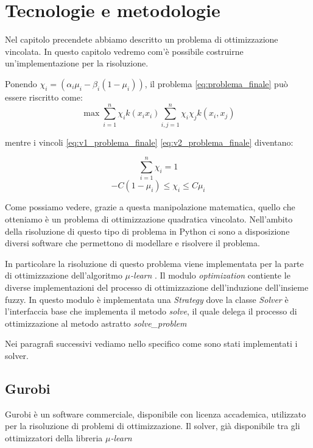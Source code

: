 \documentclass[a4paper,12pt]{report}
\begin{document}
\chapter{Tecnologie e metodologie}
\label{Capitolo 2}
Nel capitolo precendete abbiamo descritto un problema di ottimizzazione vincolata. In questo capitolo vedremo com'è possibile costruirne un'implementazione per la risoluzione.

\bigskip

\noindent Ponendo $\chi_i = (\alpha_i\mu_i - \beta_i(1-\mu_i))$, il problema \ref{eq:problema_finale} può essere riscritto come:
\begin{equation}
    \max \displaystyle\sum_{i=1}^{n}\chi_ik(x_ix_i)\displaystyle\sum_{i,j=1}^{n}\chi_i\chi_j k(x_i,x_j)
\label{eq:problema_finale_2}
\end{equation}

\noindent mentre i vincoli \ref{eq:v1_problema_finale} \ref{eq:v2_problema_finale} diventano:

\begin{equation}
    \displaystyle\sum_{i=1}^{n}\chi_i = 1
    \label{eq:v1_problema_finale_2}
\end{equation}
\begin{equation}
    -C(1-\mu_i) \le \chi_i \le C\mu_i
    \label{eq:v2_problema_finale_2}
\end{equation}

\noindent Come possiamo vedere, grazie a questa manipolazione matematica, quello che otteniamo è un problema di ottimizzazione quadratica vincolato.
Nell'ambito della risoluzione di questo tipo di problema in Python ci sono a disposizione diversi software che permettono di modellare e risolvere il problema.

In particolare la risoluzione di questo problema viene implementata per la parte di ottimizzazione dell'algoritmo \textit{$\mu$-learn} \cite{mulearn_documentation}. Il modulo \textit{optimization} contiente le diverse implementazioni del processo di ottimizzazione dell'induzione dell'insieme fuzzy. In questo modulo è implementata una \textit{Strategy} \cite{strategy_pattern} dove la classe \textit{Solver} è l'interfaccia base che implementa il metodo \textit{solve}, il quale delega il processo di ottimizzazione al metodo astratto \textit{solve\_problem}

\bigskip

\noindent Nei paragrafi successivi vediamo nello specifico come sono stati implementati i solver.

\section{Gurobi}
Gurobi \cite{gurobi} è un software commerciale, disponibile con licenza accademica, utilizzato per la risoluzione di problemi di ottimizzazione. 
Il solver, già disponibile tra gli ottimizzatori della libreria \textit{$\mu$-learn} \cite{mulearn_documentation} 
\end{document}
